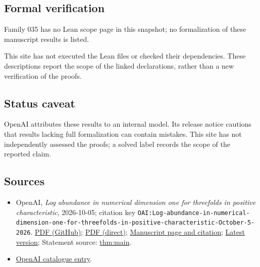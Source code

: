 \documentclass[11pt]{article}
\begin{document}
\subsection{Formal verification}
Family 035 has no Lean scope page in this snapshot; no formalization of these manuscript results is listed.

This site has not executed the Lean files or checked their dependencies. These descriptions report the scope of the linked declarations, rather than a new verification of the proofs.

\subsection{Status caveat}
OpenAI attributes these results to an internal model. Its release notice cautions that results lacking full formalization can contain mistakes. This site has not independently assessed the proofs; a solved label records the scope of the reported claim.

\subsection{Sources}
\begin{itemize}
\item OpenAI, \emph{Log abundance in numerical dimension one for threefolds in positive characteristic}, 2026-10-05; citation key \texttt{OAI:Log-abundance-in-numerical-dimension-one-for-threefolds-in-positive-characteristic-October-5-2026}. \href{https://github.com/openai/math/blob/adc7f1241b42e322a6451854ab7e4b4c146bf78a/preprints/Log-abundance-in-numerical-dimension-one-for-threefolds-in-positive-characteristic-October-5-2026/paper.pdf}{PDF (GitHub)}; \href{https://github.com/openai/math/raw/adc7f1241b42e322a6451854ab7e4b4c146bf78a/preprints/Log-abundance-in-numerical-dimension-one-for-threefolds-in-positive-characteristic-October-5-2026/paper.pdf}{PDF (direct)}; \href{https://github.com/openai/math/blob/adc7f1241b42e322a6451854ab7e4b4c146bf78a/preprints/Log-abundance-in-numerical-dimension-one-for-threefolds-in-positive-characteristic-October-5-2026/README.md}{Manuscript page and citation}; \href{https://github.com/openai/math/blob/main/preprints/Log-abundance-in-numerical-dimension-one-for-threefolds-in-positive-characteristic-October-5-2026/paper.pdf}{Latest version}; Statement source: \href{https://github.com/openai/math/blob/adc7f1241b42e322a6451854ab7e4b4c146bf78a/preprints/Log-abundance-in-numerical-dimension-one-for-threefolds-in-positive-characteristic-October-5-2026/build/sections/introduction.tex\#L15}{thm:main}.
\item \href{https://github.com/openai/math/blob/adc7f1241b42e322a6451854ab7e4b4c146bf78a/CONTENTS.md}{OpenAI catalogue entry}.
\end{itemize}
\end{document}
